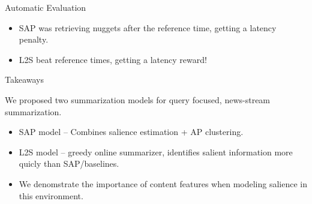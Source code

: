 \begin{frame}{Automatic Evaluation}
\begin{itemize}
\item<2-> SAP was retrieving nuggets after the reference time, getting a latency penalty.
\item<3-> L2S beat reference times, getting a latency reward!

\end{itemize}
\end{frame}

%
%
%
%

\begin{frame}{Takeaways}

 We proposed two summarization models for query focused, news-stream summarization.
\begin{itemize}
                    \item SAP model -- Combines salience estimation + AP clustering.
\vspace{5pt}

                    \item L2S model -- greedy online summarizer, identifies salient information more quicly than SAP/baselines.

\vspace{5pt}
                    \item We denomstrate the importance of content features 
when modeling salience in this environment.
                \end{itemize}




\end{frame}
